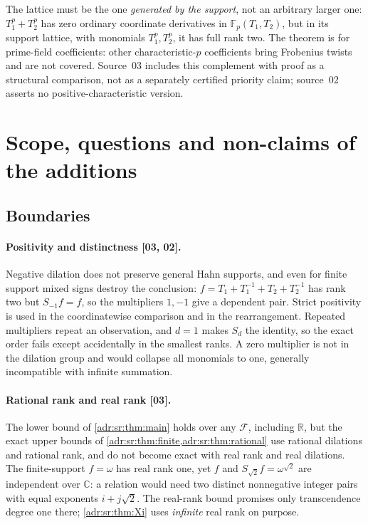 \documentclass[11pt,letterpaper]{article}
\numberwithin{equation}{section}
\theoremstyle{definition}
\theoremstyle{remark}
\newcommand{\C}{\mathbb C}
\newcommand{\R}{\mathbb R}
\newcommand{\src}[1]{\textup{[#1]}}%
\begin{document}
The lattice must be the one \emph{generated by the support}, not an arbitrary
larger one: $T_1^p+T_2^p$ has zero ordinary coordinate derivatives in
$\mathbb F_p(T_1,T_2)$, but in its support lattice, with monomials
$T_1^p,T_2^p$, it has full rank two. The theorem is for prime-field
coefficients: other characteristic-$p$ coefficients bring Frobenius twists and
are not covered. Source~03 includes this complement with proof as a structural
comparison, not as a separately certified priority claim; source~02 asserts no
positive-characteristic version.

\section{Scope, questions and non-claims of the additions}
\label{adr:sr:sec:scope}

\subsection{Boundaries}
\label{adr:sr:sec:boundaries}

\paragraph{Positivity and distinctness \src{03, 02}.} Negative dilation does
not preserve general Hahn supports, and even for finite support mixed signs
destroy the conclusion: $f=T_1+T_1^{-1}+T_2+T_2^{-1}$ has rank two but
$S_{-1}f=f$, so the multipliers $1,-1$ give a dependent pair. Strict
positivity is used in the coordinatewise comparison and in the rearrangement.
Repeated multipliers repeat an observation, and $d=1$ makes $S_d$ the identity,
so the exact order fails except accidentally in the smallest ranks. A zero
multiplier is not in the dilation group and would collapse all monomials to
one, generally incompatible with infinite summation.

\paragraph{Rational rank and real rank \src{03}.} The lower bound of
\cref{adr:sr:thm:main} holds over any $\mathcal F$, including $\R$, but the
exact upper bounds of \cref{adr:sr:thm:finite,adr:sr:thm:rational} use
rational dilations and rational rank, and do not become exact with real rank
and real dilations. The finite-support $f=\omega$ has real rank one, yet $f$
and $S_{\sqrt2}f=\omega^{\sqrt2}$ are independent over $\C$: a relation would
need two distinct nonnegative integer pairs with equal exponents $i+j\sqrt2$.
The real-rank bound promises only transcendence degree one there;
\cref{adr:sr:thm:Xi} uses \emph{infinite} real rank on purpose.
\end{document}
